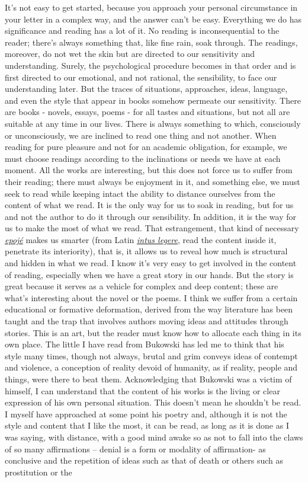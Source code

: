 \documentclass[]{book}
\begin{document}
It's not easy to get started, because you approach your personal circumstance in your letter in a complex way, and the answer can't be easy. Everything we do has significance and reading has a lot of it. No reading is inconsequential to the reader; there's always something that, like fine rain, soak through. The readings, moreover, do not wet the skin but are directed to our sensitivity and understanding. Surely, the psychological procedure becomes in that order and is first directed to our emotional, and not rational, the sensibility, to face our understanding later. But the traces of situations, approaches, ideas, language, and even the style that appear in books somehow permeate our sensitivity. There are books - novels, essays, poems - for all tastes and situations, but not all are suitable at any time in our lives. There is always something to which, consciously or unconsciously, we are inclined to read one thing and not another. When reading for pure pleasure and not for an academic obligation, for example, we must choose readings according to the inclinations or needs we have at each moment. All the works are interesting, but this does not force us to suffer from their reading; there must always be enjoyment in it, and something else, we must seek to read while keeping intact the ability to distance ourselves from the content of what we read. It is the only way for us to soak in reading, but for us and not the author to do it through our sensibility. In addition, it is the way for us to make the most of what we read. That estrangement, that kind of necessary \href{https://en.wikipedia.org/wiki/Epoch\%C3\%A9}{\emph{epojé}} makes us smarter (from Latin \href{https://www.allwords.com/word-intellect.html}{\emph{intus legere}}, read the content inside it, penetrate its interiority), that is, it allows us to reveal how much is structural and hidden in what we read. I know it's very easy to get involved in the content of reading, especially when we have a great story in our hands. But the story is great because it serves as a vehicle for complex and deep content; these are what's interesting about the novel or the poems. I think we suffer from a certain educational or formative deformation, derived from the way literature has been taught and the trap that involves authors moving ideas and attitudes through stories. This is an art, but the reader must know how to allocate each thing in its own place. The little I have read from Bukowski has led me to think that his style many times, though not always, brutal and grim conveys ideas of contempt and violence, a conception of reality devoid of humanity, as if reality, people and things, were there to beat them. Acknowledging that Bukowski was a victim of himself, I can understand that the content of his works is the living or clear expression of his own personal situation. This doesn't mean he shouldn't be read. I myself have approached at some point his poetry and, although it is not the style and content that I like the most, it can be read, as long as it is done as I was saying, with distance, with a good mind awake so as not to fall into the claws of so many affirmations -- denial is a form or modality of affirmation- as conclusive and the repetition of ideas such as that of death or others such as prostitution or the 
\end{document}
